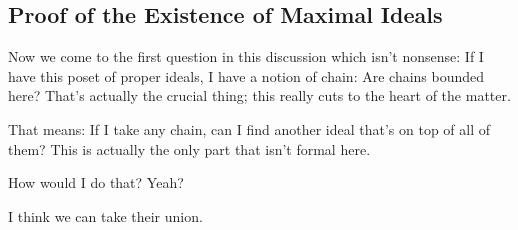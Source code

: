 \begin{content}
\end{content}

\subsection{Proof of the Existence of Maximal Ideals}

\begin{speech}[00:42:03 - 00:42:52]
Now we come to the first question in this discussion which isn't nonsense: If I have this poset of proper ideals, I have a notion of chain: Are chains bounded here? That's actually the crucial thing; this really cuts to the heart of the matter.


That means: If I take any chain, can I find another ideal that's on top of all of them? This is actually the only part that isn't formal here.

How would I do that? Yeah?
\end{speech}

\begin{student}
I think we can take their union.
\end{student}

